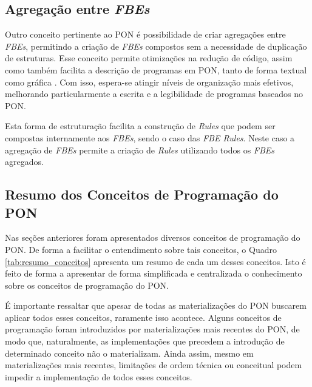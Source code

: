 \subsection{Agregação entre \textit{FBEs}}\label{sec:agregacao}

Outro conceito pertinente ao PON é possibilidade de criar agregações entre
\textit{FBEs}, permitindo a criação de \textit{FBEs} compostos sem a necessidade
de duplicação de estruturas. Esse conceito permite otimizações na redução de
código, assim como também facilita a descrição de programas em PON, tanto de
forma textual como gráfica \cite{doc_ronszcka_2019}. Com isso, espera-se atingir
níveis de organização mais efetivos, melhorando particularmente a escrita e a
legibilidade de programas baseados no PON.

Esta forma de estruturação facilita a construção de \textit{Rules} que podem ser
compostas internamente aos \textit{FBEs}, sendo o caso das \textit{FBE Rules}.
Neste caso a agregação de \textit{FBEs} permite a criação de \textit{Rules}
utilizando todos os \textit{FBEs} agregados. 


\subsection{Resumo dos Conceitos de Programação do PON}

Nas seções anteriores foram apresentados diversos conceitos de programação do
PON. De forma a facilitar o entendimento sobre tais conceitos, o Quadro
\ref{tab:resumo_conceitos} apresenta um resumo de cada um desses conceitos.
Isto é feito de forma a apresentar de forma simplificada e centralizada o
conhecimento sobre os conceitos de programação do PON.

É importante ressaltar que apesar de todas as materializações do PON buscarem
aplicar todos esses conceitos, raramente isso acontece. Alguns conceitos de
programação foram introduzidos por materializações mais recentes do PON, de modo
que, naturalmente, as implementações que precedem a introdução de determinado
conceito não o materializam. Ainda assim, mesmo em materializações mais recentes,
limitações de ordem técnica ou conceitual podem impedir a implementação de todos
esses conceitos.

